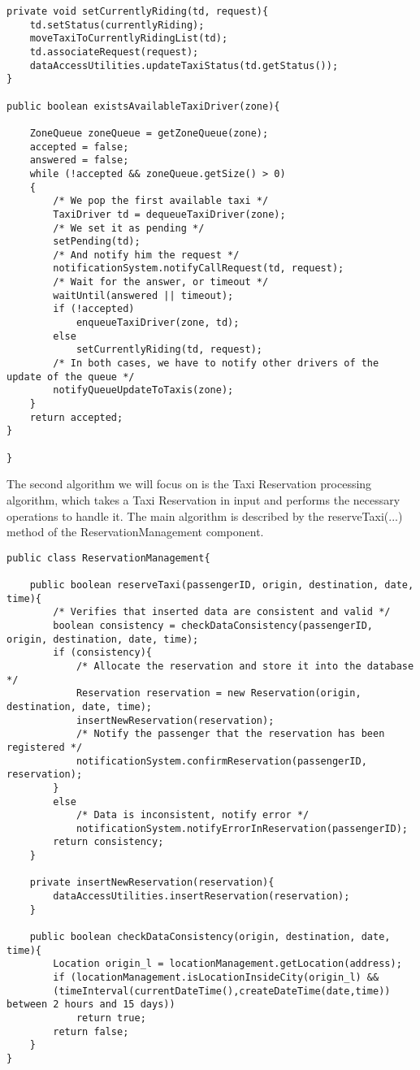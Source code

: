 \begin{lstlisting}
private void setCurrentlyRiding(td, request){
	td.setStatus(currentlyRiding);
	moveTaxiToCurrentlyRidingList(td);
	td.associateRequest(request);
	dataAccessUtilities.updateTaxiStatus(td.getStatus());
}

public boolean existsAvailableTaxiDriver(zone){
	
	ZoneQueue zoneQueue = getZoneQueue(zone);
	accepted = false;
	answered = false;	
	while (!accepted && zoneQueue.getSize() > 0)
	{
		/* We pop the first available taxi */
		TaxiDriver td = dequeueTaxiDriver(zone);
		/* We set it as pending */
		setPending(td);
		/* And notify him the request */
		notificationSystem.notifyCallRequest(td, request);
		/* Wait for the answer, or timeout */
		waitUntil(answered || timeout);
		if (!accepted)
			enqueueTaxiDriver(zone, td);
		else
			setCurrentlyRiding(td, request);
		/* In both cases, we have to notify other drivers of the update of the queue */
		notifyQueueUpdateToTaxis(zone);
	}
	return accepted;
}

}	
\end{lstlisting}

The second algorithm we will focus on is the Taxi Reservation processing algorithm, which takes a Taxi Reservation in input and performs the necessary operations to handle it. The main algorithm is described by the reserveTaxi(...) method of the ReservationManagement component.

\begin{lstlisting}
public class ReservationManagement{

	public boolean reserveTaxi(passengerID, origin, destination, date, time){
		/* Verifies that inserted data are consistent and valid */
		boolean consistency = checkDataConsistency(passengerID, origin, destination, date, time);
		if (consistency){
			/* Allocate the reservation and store it into the database */
			Reservation reservation = new Reservation(origin, destination, date, time);
			insertNewReservation(reservation);
			/* Notify the passenger that the reservation has been registered */
			notificationSystem.confirmReservation(passengerID, reservation);
		}
		else
			/* Data is inconsistent, notify error */
			notificationSystem.notifyErrorInReservation(passengerID);
		return consistency;
	}
	
	private insertNewReservation(reservation){
		dataAccessUtilities.insertReservation(reservation);
	}
	
	public boolean checkDataConsistency(origin, destination, date, time){
		Location origin_l = locationManagement.getLocation(address);
		if (locationManagement.isLocationInsideCity(origin_l) && 
		(timeInterval(currentDateTime(),createDateTime(date,time)) between 2 hours and 15 days))
			return true;
		return false; 
	}
}	
\end{lstlisting}

